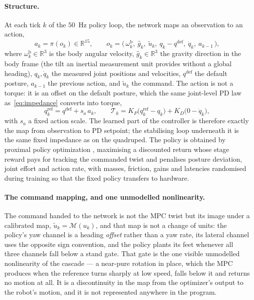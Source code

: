 \documentclass[11pt,a4paper]{article}
\newcommand{\R}{\mathbb{R}}
\newcommand{\qdef}{q^{\mathrm{def}}}
\begin{document}
\paragraph{Structure.} At each tick $k$ of the $50$~Hz policy loop, the network maps an observation to an
action,
\begin{equation}
  a_k=\pi(o_k)\in\R^{15},
  \qquad
  o_k=\big(\,\omega^{\mathrm{b}}_k,\ \hat g_k,\ \tilde u_k,\ q_k-\qdef,\ \dot q_k,\ a_{k-1}\,\big),
  \label{eq:rlpolicy}
\end{equation}
where $\omega^{\mathrm{b}}_k\in\R^3$ is the body angular velocity, $\hat g_k\in\R^3$ the gravity direction in
the body frame (the tilt an inertial measurement unit provides without a global heading), $q_k,\dot q_k$ the
measured joint positions and velocities, $\qdef$ the default posture, $a_{k-1}$ the previous action, and
$\tilde u_k$ the command. The action is not a torque: it is an offset on the default posture, which the same
joint-level PD law as~\eqref{eq:impedance} converts into torque,
\begin{equation}
  q_k^{\mathrm{ref}}=\qdef+s_a\,a_k,
  \qquad
  \mathcal{T}_k=K_P\big(q_k^{\mathrm{ref}}-q_k\big)+K_D\big(0-\dot q_k\big),
  \label{eq:rlpd}
\end{equation}
with $s_a$ a fixed action scale. The learned part of the controller is therefore exactly the map from
observation to PD setpoint; the stabilising loop underneath it is the same fixed impedance as on the
quadruped. The policy is obtained by proximal policy optimization \cite{schulman2017ppo}, maximising a
discounted return whose stage reward pays for tracking the commanded twist and penalises posture deviation,
joint effort and action rate, with masses, friction, gains and latencies randomised during training so that
the fixed policy transfers to hardware.

\paragraph{The command mapping, and one unmodelled nonlinearity.} The command handed to the network is not
the MPC twist but its image under a calibrated map, $\tilde u_k=\mathcal{M}(u_k)$, and that map is not a
change of units: the policy's yaw channel is a heading \emph{offset} rather than a yaw rate, its lateral
channel uses the opposite sign convention, and the policy plants its feet whenever all three channels fall
below a stand gate. That gate is the one visible unmodelled nonlinearity of the cascade --- a near-pure
rotation in place, which the MPC produces when the reference turns sharply at low speed, falls below it and
returns no motion at all. It is a discontinuity in the map from the optimizer's output to the robot's motion,
and it is not represented anywhere in the program.
\end{document}
